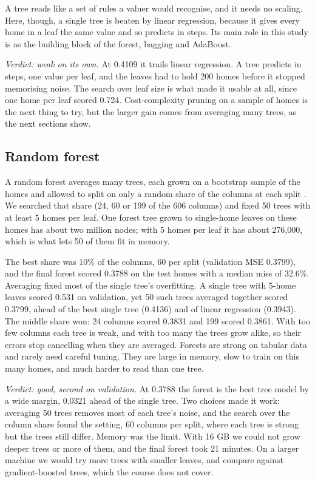 \documentclass[sigconf,nonacm,10pt]{acmart}
\begin{document}
A tree reads like a set of rules a valuer would recognise, and it needs no scaling. Here, though, a single tree is beaten by linear regression, because it gives every home in a leaf the same value and so predicts in steps. Its main role in this study is as the building block of the forest, bagging and AdaBoost.

\emph{Verdict: weak on its own.} At 0.4109 it trails linear regression. A tree predicts in steps, one value per leaf, and the leaves had to hold 200 homes before it stopped memorising noise. The search over leaf size is what made it usable at all, since one home per leaf scored 0.724. Cost-complexity pruning on a sample of homes is the next thing to try, but the larger gain comes from averaging many trees, as the next sections show.

\subsection{Random forest}
A random forest averages many trees, each grown on a bootstrap sample of the homes and allowed to split on only a random share of the columns at each split \cite{breiman2001}. We searched that share (24, 60 or 199 of the 606 columns) and fixed 50 trees with at least 5 homes per leaf. One forest tree grown to single-home leaves on these homes has about two million nodes; with 5 homes per leaf it has about 276,000, which is what lets 50 of them fit in memory.

The best share was 10\% of the columns, 60 per split (validation MSE 0.3799), and the final forest scored 0.3788 on the test homes with a median miss of 32.6\%. Averaging fixed most of the single tree's overfitting. A single tree with 5-home leaves scored 0.531 on validation, yet 50 such trees averaged together scored 0.3799, ahead of the best single tree (0.4136) and of linear regression (0.3943). The middle share won: 24 columns scored 0.3831 and 199 scored 0.3861. With too few columns each tree is weak, and with too many the trees grow alike, so their errors stop cancelling when they are averaged. Forests are strong on tabular data and rarely need careful tuning. They are large in memory, slow to train on this many homes, and much harder to read than one tree.

\emph{Verdict: good, second on validation.} At 0.3788 the forest is the best tree model by a wide margin, 0.0321 ahead of the single tree. Two choices made it work: averaging 50 trees removes most of each tree's noise, and the search over the column share found the setting, 60 columns per split, where each tree is strong but the trees still differ. Memory was the limit. With 16 GB we could not grow deeper trees or more of them, and the final forest took 21 minutes. On a larger machine we would try more trees with smaller leaves, and compare against gradient-boosted trees, which the course does not cover.
\end{document}
